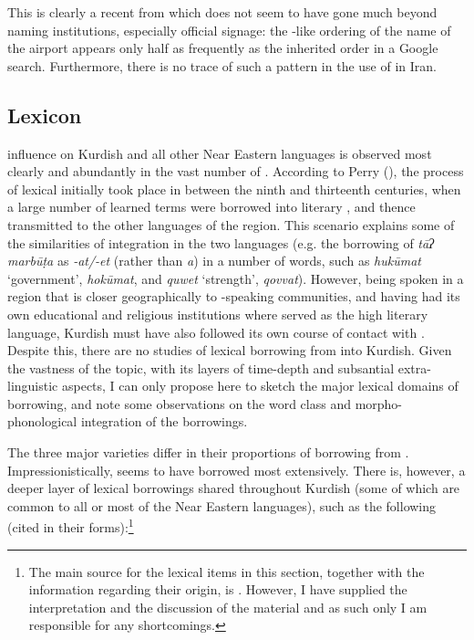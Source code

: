 \documentclass[output=paper]{langsci/langscibook}
\begin{document}

This is clearly a recent  from  which does not seem to have gone much beyond naming institutions, especially official signage: the -like ordering of the name of the airport appears only half as frequently as the inherited order in a Google search. Furthermore, there is no trace of such a  pattern in the use of  in Iran.  

\subsection{Lexicon}

 influence on Kurdish and all other Near Eastern languages is observed most clearly and abundantly in the vast number of . According to Perry (\citeyear[97]{Perry2005}), the process of lexical  initially took place in  between the ninth and thirteenth centuries, when a large number of learned terms were borrowed into literary , and thence transmitted to the other languages of the region. This scenario explains some of the similarities of  integration in the two languages (e.g. the borrowing of \textit{tāʔ} \textit{marbūṭa} as \textit{{}-at/-et} (rather than \textit{a}) in a number of words, such as \textit{hukūmat} ‘government’,  \textit{hokūmat}, and \textit{quwet} ‘strength’,  \textit{qovvat}). However, being spoken in a region that is closer geographically to -speaking communities, and having had its own educational and religious institutions where  served as the high literary language, Kurdish must have also followed its own course of contact with . Despite this, there are no studies of lexical borrowing from  into Kurdish. Given the vastness of the topic, with its layers of time-depth and subsantial extra-linguistic aspects, I can only propose here to sketch the major lexical domains of borrowing, and note some observations on the word class and morpho-phonological integration of the borrowings. 

The three major varieties differ in their proportions of borrowing from . Impressionistically,  seems to have borrowed most extensively. There is, however, a deeper layer of lexical borrowings shared throughout Kurdish (some of which are common to all or most of the Near Eastern languages), such as the following (cited in their  forms):\footnote{The main source for the lexical items in this section, together with the information regarding their  origin, is \citet{Chyet2003}. However, I have supplied the interpretation and the discussion of the material and as such only I am responsible for any shortcomings.} 
\end{document}
